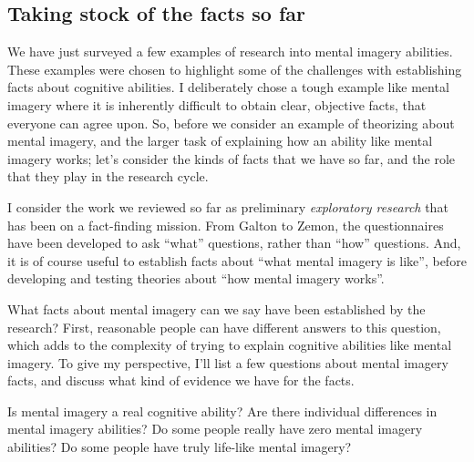 \documentclass[
  oneside,
  12pt]{crumpbook}
\begin{document}
\hypertarget{taking-stock-of-the-facts-so-far}{%
\subsection{Taking stock of the facts so far}\label{taking-stock-of-the-facts-so-far}}

We have just surveyed a few examples of research into mental imagery abilities. These examples were chosen to highlight some of the challenges with establishing facts about cognitive abilities. I deliberately chose a tough example like mental imagery where it is inherently difficult to obtain clear, objective facts, that everyone can agree upon. So, before we consider an example of theorizing about mental imagery, and the larger task of explaining how an ability like mental imagery works; let's consider the kinds of facts that we have so far, and the role that they play in the research cycle.

I consider the work we reviewed so far as preliminary \emph{exploratory research} that has been on a fact-finding mission. From Galton to Zemon, the questionnaires have been developed to ask ``what'' questions, rather than ``how'' questions. And, it is of course useful to establish facts about ``what mental imagery is like'', before developing and testing theories about ``how mental imagery works''.

What facts about mental imagery can we say have been established by the research? First, reasonable people can have different answers to this question, which adds to the complexity of trying to explain cognitive abilities like mental imagery. To give my perspective, I'll list a few questions about mental imagery facts, and discuss what kind of evidence we have for the facts.

Is mental imagery a real cognitive ability? Are there individual differences in mental imagery abilities? Do some people really have zero mental imagery abilities? Do some people have truly life-like mental imagery?
\end{document}
